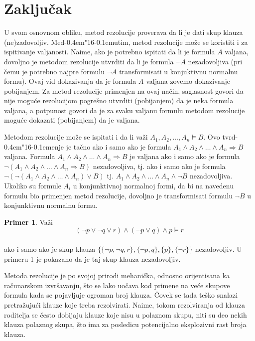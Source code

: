 \documentclass[12pt, a4paper, titlepage, twoside]{article}
\theoremstyle{definition}
\newtheorem{pr}{\sc Primer}
\def\dj{d\kern-0.4em\char"16\kern-0.1em}
\begin{document}
\section{Zaklju\v cak}
\vspace{1cm}\hspace{0.5cm}
U svom osnovnom obliku, metod rezolucije proverava da li je dati skup
klauza (ne)zadovoljiv. Me\dj{}utim, metod rezolucije mo\v ze se koristiti i za ispitivanje
va\-lja\-no\-sti. Naime, ako je potrebno ispitati da li je formula $A$ valjana,
dovoljno je metodom rezolucije utvrditi da li je formula $\neg A$ nezadovoljiva (pri
\v cemu je potrebno najpre formulu $\neg A$ transformisati u konjuktivnu normalnu
formu). Ovaj vid dokazivanja da je formula $A$ valjana zovemo dokazivanje pobijanjem.
Za metod rezolucije primenjen na ovaj na\v cin, saglasnost govori da
nije mogu\'ce rezolucijom pogre\v sno utvrditi (pobijanjem) da je neka formula valjana,
a potpunost govori da je za svaku valjanu formulu metodom rezolucije
mogu\'ce dokazati (pobijanjem) da je valjana.


Metodom rezolucije mo\v ze se ispitati i da li va\v zi $A_1, A_2,\dots , A_n \models B$. Ovo
tvr\dj{}enje je ta\v cno ako i samo ako je formula 
$A_1 \land A_2 \land \dots \land A_n \Rightarrow B$ valjana. 
Formula $A_1 \land A_2 \land \dots \land A_n \Rightarrow B$ je valjana 
ako i samo ako je formula $\neg (A_1 \land A_2 \land \dots \land A_n \Rightarrow B)$ 
nezadovoljiva, tj. ako i samo ako je formula
$\neg (\neg (A_1 \land A_2 \land \dots \land A_n) \lor B)$ tj. 
$A_1 \land A_2 \land\dots \land A_n \land \neg B$ nezadovoljiva. Ukoliko su formule 
$A_i$ u konjunktivnoj normalnoj formi, da bi na navedenu formulu bio primenjen metod rezolucije,
dovoljno je transformisati formulu $\neg B$ u konjunktivnu normalnu formu.


\begin{pr}
Va\v zi
$$(\neg p \lor \neg q \lor r) \land (\neg p \lor q) \land p \models r$$\\
ako i samo ako je skup klauza $\{\{\neg p, \neg q, r\}, \{\neg p, q\}, \{p\}, \{\neg r\}\}$ 
nezadovoljiv. U primeru 1 je pokazano da je taj skup klauza nezadovoljiv.
\end{pr}


Metoda rezolucije je po svojoj prirodi mehani\v cka, odnosno orijentisana ka ra\-\v cu\-nar\-skom
izvr\v savanju, \v sto se lako uo\v cava kod primene na ve\'ce skupove formula kada se pojavljuje 
ogroman broj klauza. \v Covek se tada te\v sko snalazi pretra\v zuju\'ci klauze koje treba 
rezolvirati. Naime, tokom rezolviranja od klauza roditelja se \v cesto dobijaju klauze koje nisu 
u polaznom skupu, niti su deo nekih klauza polaznog skupa, \v sto ima za posledicu potencijalno 
eksplozivni rast broja klauza. 
\end{document}

